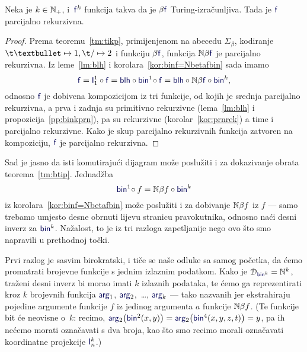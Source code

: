 
\begin{teorem}[{name=[parcijalna rekurzivnost Turing-izračunljivih brojevnih funkcija]}]\label{tm:btip}
Neka je $k\in{\mathbb N}_+$, i\, $\f f^k$\! funkcija takva da je $\beta\f f$ Turing-izračunljiva. Tada je $\f f$ parcijalno rekurzivna.
\end{teorem}
\begin{proof}
Prema teoremu~\ref{tm:tikp}, primijenjenom na abecedu $\Sigma_\beta$, kodiranje $\t\textbullet\mapsto1,\t/\mapsto2$ i funkciju $\beta\f f$, funkcija $\N\beta\f f$ je parcijalno rekurzivna. Iz leme~\ref{lm:blh} i korolara~\ref{kor:binf=Nbetafbin} sada imamo
\begin{equation}
    \f f=\f I_1^1\circ\f f=\f{blh}\circ\f{bin}^1\!\circ\f f=\f{blh}\circ\N\beta\f f\circ\f{bin}^k\text,
\end{equation}
odnosno $\f f$ je dobivena kompozicijom iz tri funkcije, od kojih je srednja parcijalno rekurzivna, a prva i zadnja su primitivno rekurzivne (lema~\ref{lm:blh} i propozicija~\ref{pp:binkprn}), pa su rekurzivne (korolar~\ref{kor:prnrek}) a time i parcijalno rekurzivne. Kako je skup parcijalno rekurzivnih funkcija zatvoren na kompoziciju, $\f f$ je parcijalno rekurzivna.
\end{proof}

Sad je jasno da isti komutirajući dijagram može poslužiti i za dokazivanje obrata teorema~\ref{tm:btip}. Jednadžba
\begin{equation}
    \f{bin}^1\!\circ f=\N\beta f\circ\f{bin}^k
\end{equation}
iz korolara~\ref{kor:binf=Nbetafbin} može poslužiti i za dobivanje ${\mathbb N}\beta f$ iz $f$ --- samo trebamo umjesto desne obrnuti lijevu stranicu pravokutnika, odnosno naći desni inverz za $\f{bin}^k$. Nažalost, to je iz tri razloga zapetljanije nego ovo što smo napravili u prethodnoj točki.

Prvi razlog je sasvim birokratski, i tiče se naše odluke sa samog početka, da ćemo promatrati brojevne funkcije s jednim izlaznim podatkom. Kako je $\dom{\f{bin}^k}=\N^k$, traženi desni inverz bi morao imati $k$ izlaznih podataka, te ćemo ga reprezentirati kroz $k$ brojevnih funkcija $\f{arg}_1$, $\f{arg}_2$,~\ldots, $\f{arg}_k$ --- tako nazvanih jer ekstrahiraju pojedine argumente funkcije $f$ iz jedinog argumenta $a$ funkcije ${\mathbb N}\beta f$. (Te funkcije bit će neovisne o~$k$: recimo, $\f{arg}_2\bigl(\f{bin}^2(x,y)\bigr)=\f{arg}_2\bigl(\f{bin}^4(x,y,z,t)\bigr)=y$, pa ih nećemo morati označavati s dva broja, kao što smo recimo morali označavati koordinatne projekcije $\f I_n^k$.)


